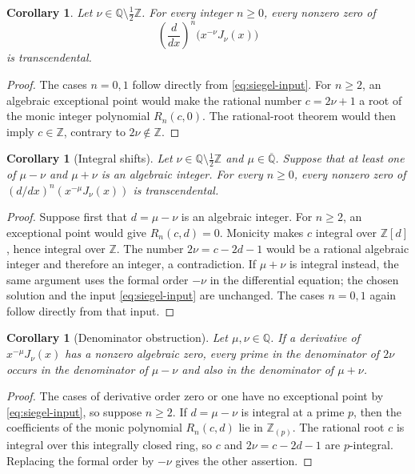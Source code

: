 \documentclass[11pt]{article}
\newtheorem{corollary}[theorem]{Corollary}
\newcommand{\Z}{\mathbb Z}
\newcommand{\Q}{\mathbb Q}
\begin{document}
\begin{corollary}\label{cor:normalized}
Let $\nu\in\Q\setminus\tfrac12\Z$. For every integer $n\ge0$,
every nonzero zero of
\[
 \left(\frac d{dx}\right)^n\bigl(x^{-\nu}J_\nu(x)\bigr)
\]
is transcendental.
\end{corollary}

\begin{proof}
The cases $n=0,1$ follow directly from \eqref{eq:siegel-input}.
For $n\ge2$, an algebraic exceptional point would make the rational
number $c=2\nu+1$ a root of the monic integer polynomial $R_n(c,0)$.
The rational-root theorem would then imply $c\in\Z$, contrary to
$2\nu\notin\Z$.
\end{proof}

\begin{corollary}[Integral shifts]\label{cor:shifts}
Let $\nu\in\Q\setminus\tfrac12\Z$ and
$\mu\in\overline{\Q}$. Suppose that at least one of $\mu-\nu$
and $\mu+\nu$ is an algebraic integer. For every $n\ge0$, every
nonzero zero of $(d/dx)^n(x^{-\mu}J_\nu(x))$ is transcendental.
\end{corollary}

\begin{proof}
Suppose first that $d=\mu-\nu$ is an algebraic integer. For $n\ge2$,
an exceptional point would give $R_n(c,d)=0$. Monicity makes $c$
integral over $\Z[d]$, hence integral over $\Z$. The number
$2\nu=c-2d-1$ would be a rational algebraic integer and therefore an
integer, a contradiction. If $\mu+\nu$ is integral instead, the same
argument uses the formal order $-\nu$ in the differential equation;
the chosen solution and the input \eqref{eq:siegel-input} are unchanged.
The cases $n=0,1$ again follow directly from that input.
\end{proof}

\begin{corollary}[Denominator obstruction]\label{cor:denominators}
Let $\mu,\nu\in\Q$. If a derivative of $x^{-\mu}J_\nu(x)$ has
a nonzero algebraic zero, every prime in the denominator of $2\nu$
occurs in the denominator of $\mu-\nu$ and also in the denominator
of $\mu+\nu$.
\end{corollary}

\begin{proof}
The cases of derivative order zero or one have no exceptional point
by \eqref{eq:siegel-input}, so suppose $n\ge2$.
If $d=\mu-\nu$ is integral at a prime $p$, then the coefficients
of the monic polynomial $R_n(c,d)$ lie in $\Z_{(p)}$. The rational
root $c$ is integral over this integrally closed ring, so $c$ and
$2\nu=c-2d-1$ are $p$-integral. Replacing the formal order by
$-\nu$ gives the other assertion.
\end{proof}
\end{document}
